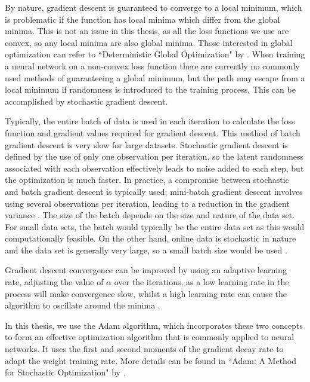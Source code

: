 \documentclass[honours,12pt]{unswthesis}
\numberwithin{equation}{section}
\theoremstyle{definition}
\begin{document}
By nature, gradient descent is guaranteed to converge to a local minimum, which is problematic if the function has local minima which differ from the global minima. This is not an issue in this thesis, as all the loss functions we use are convex, so any local minima are also global minima. Those interested in global optimization can refer to ``Deterministic Global Optimization" by \citet{floudas}. When training a neural network on a non-convex loss function there are currently no commonly used methods of guaranteeing a global minimum, but the path may escape from a local minimum if randomness is introduced to the training process. This can be accomplished by stochastic gradient descent.

Typically, the entire batch of data is used in each iteration to calculate the loss function and gradient values required for gradient descent. This method of batch gradient descent is very slow for large datasets. Stochastic gradient descent is defined by the use of only one observation per iteration, so the latent randomness associated with each observation effectively leads to noise added to each step, but the optimization is much faster. In practice, a compromise between stochastic and batch gradient descent is typically used; mini-batch gradient descent involves using several observations per iteration, leading to a reduction in the gradient variance \citep{batch, optimneural}. The size of the batch depends on the size and nature of the data set. For small data sets, the batch would typically be the entire data set as this would computationally feasible. On the other hand, online data is stochastic in nature and the data set is generally very large, so a small batch size would be used \citep{bengio}.

Gradient descent convergence can be improved by using an adaptive learning rate, adjusting the value of $\alpha$ over the iterations, as a low learning rate in the process will make convergence slow, whilst a high learning rate can cause the algorithm to oscillate around the minima \citep{optimneural}.

In this thesis, we use the Adam algorithm, which incorporates these two concepts to form an effective optimization algorithm that is commonly applied to neural networks. It uses the first and second moments of the gradient decay rate to adapt the weight training rate. More details can be found in ``Adam: A Method for Stochastic Optimization" by \citet{adam}.
\end{document}
